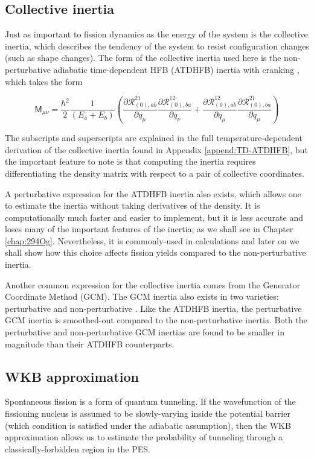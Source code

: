 \subsection{Collective inertia}
Just as important to fission dynamics as the energy of the system is the collective inertia, which describes the tendency of the system to resist configuration changes (such as shape changes). The form of the collective inertia used here is the non-perturbative adiabatic time-dependent HFB (ATDHFB) inertia with cranking \cite{Baran2011}, which takes the form

\begin{equation}\label{eq:mATDHFB-np}
\mathsf{M}_{\mu\nu} =  \frac{\hbar^2}{2}\frac{1}{(E_a+E_b)}\left(\frac{\partial\mathcal{R}^{21}_{(0),ab}}{\partial q_\mu}\frac{\partial\mathcal{R}^{12}_{(0),ba}}{\partial q_\nu}+\frac{\partial\mathcal{R}^{12}_{(0),ab}}{\partial q_\mu}\frac{\partial\mathcal{R}^{21}_{(0),ba}}{\partial q_\mu}\right)
\end{equation}

\noindent The subscripts and superscripts are explained in the full temperature-dependent derivation of the collective inertia found in Appendix \ref{append:TD-ATDHFB}, but the important feature to note is that computing the inertia requires differentiating the density matrix with respect to a pair of collective coordinates.

A perturbative expression for the ATDHFB inertia also exists, which allows one to estimate the inertia without taking derivatives of the density. It is computationally much faster and easier to implement, but it is less accurate and loses many of the important features of the inertia, as we shall see in Chapter \ref{chap:294Og}. Nevertheless, it is commonly-used in calculations and later on we shall show how this choice affects fission yields compared to the non-perturbative inertia.

Another common expression for the collective inertia comes from the Generator Coordinate Method (GCM). The GCM inertia also exists in two varieties: perturbative and non-perturbative \cite{Giuliani2018b}. Like the ATDHFB inertia, the perturbative GCM inertia is smoothed-out compared to the non-perturbative inertia. Both the perturbative and non-perturbative GCM inertias are found to be smaller in magnitude than their ATDHFB counterparts.

\subsection{WKB approximation}\label{sect:wkb}
Spontaneous fission is a form of quantum tunneling. If the wavefunction of the fissioning nucleus is assumed to be slowly-varying inside the potential barrier (which condition is satisfied under the adiabatic assumption), then the WKB approximation allows us to estimate the probability of tunneling through a classically-forbidden region in the PES.

